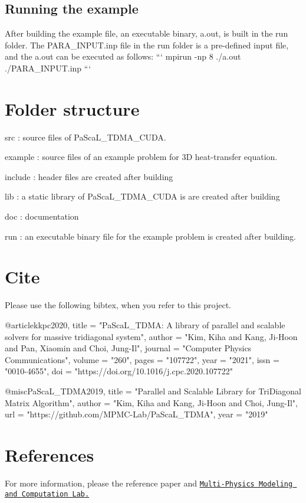 \subsection*{Running the example}

After building the example file, an executable binary, {\ttfamily a.\+out}, is built in the {\ttfamily run} folder. The {\ttfamily P\+A\+R\+A\+\_\+\+I\+N\+P\+U\+T.\+inp} file in the {\ttfamily run} folder is a pre-\/defined input file, and the {\ttfamily a.\+out} can be executed as follows\+: ``` mpirun -\/np 8 ./a.out ./\+P\+A\+R\+A\+\_\+\+I\+N\+P\+UT.inp ```

\section*{Folder structure}


\begin{DoxyItemize}
\item {\ttfamily src} \+: source files of Pa\+Sca\+L\+\_\+\+T\+D\+M\+A\+\_\+\+C\+U\+DA.
\item {\ttfamily example} \+: source files of an example problem for 3D heat-\/transfer equation.
\item {\ttfamily include} \+: header files are created after building
\item {\ttfamily lib} \+: a static library of Pa\+Sca\+L\+\_\+\+T\+D\+M\+A\+\_\+\+C\+U\+DA is are created after building
\item {\ttfamily doc} \+: documentation
\item {\ttfamily run} \+: an executable binary file for the example problem is created after building.
\end{DoxyItemize}

\section*{Cite}

Please use the following bibtex, when you refer to this project. \begin{DoxyVerb}@article{kkpc2020,
    title = "PaScaL_TDMA: A library of parallel and scalable solvers for massive tridiagonal system",
    author = "Kim, Kiha and Kang, Ji-Hoon and Pan, Xiaomin and Choi, Jung-Il",
    journal = "Computer Physics Communications",
    volume = "260",
    pages = "107722",
    year = "2021",
    issn = "0010-4655",
    doi = "https://doi.org/10.1016/j.cpc.2020.107722"
}

@misc{PaScaL_TDMA2019,
    title  = "Parallel and Scalable Library for TriDiagonal Matrix Algorithm",
    author = "Kim, Kiha and Kang, Ji-Hoon and Choi, Jung-Il",
    url    = "https://github.com/MPMC-Lab/PaScaL_TDMA",
    year   = "2019"
}
\end{DoxyVerb}


\section*{References}

For more information, please the reference paper and \href{https://www.mpmc.yonsei.ac.kr/}{\tt Multi-\/\+Physics Modeling and Computation Lab.} 